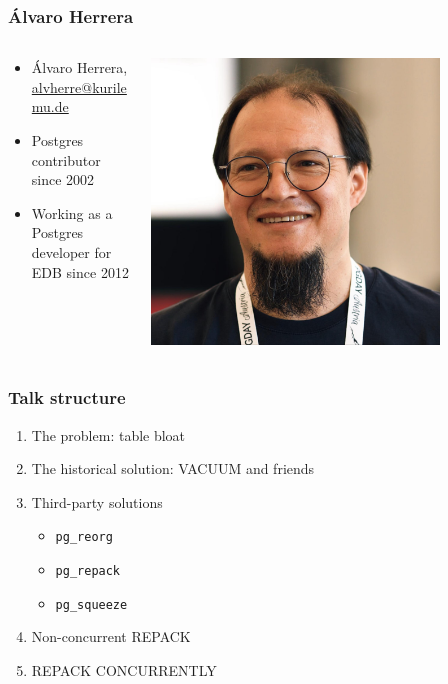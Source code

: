\begin{frame}
  \frametitle{Álvaro Herrera}

  \begin{columns}
    \begin{column}{0.8\textwidth}
      \begin{itemize}
	\item Álvaro Herrera, \href{mailto:alvherre@kurilemu.de}{alvherre@kurilemu.de}
	\item Postgres contributor since 2002
	\item Working as a Postgres developer for EDB since 2012
      \end{itemize}
    \end{column}
    \begin{column}{0.2\textwidth}
      \begin{center}
	\includegraphics[width=0.8\textwidth]{alvaro-faceshot.jpg}
      \end{center}
    \end{column}
  \end{columns}
\end{frame}

\begin{frame}
  \frametitle{Talk structure}
  \begin{enumerate}
    \item The problem: table bloat
    \item The historical solution: VACUUM and friends
    \item Third-party solutions
      \begin{itemize}
	\item \texttt{pg\_reorg}
	\item \texttt{pg\_repack}
	\item \texttt{pg\_squeeze}
      \end{itemize}
    \item Non-concurrent REPACK
    \item REPACK CONCURRENTLY
  \end{enumerate}
\end{frame}

